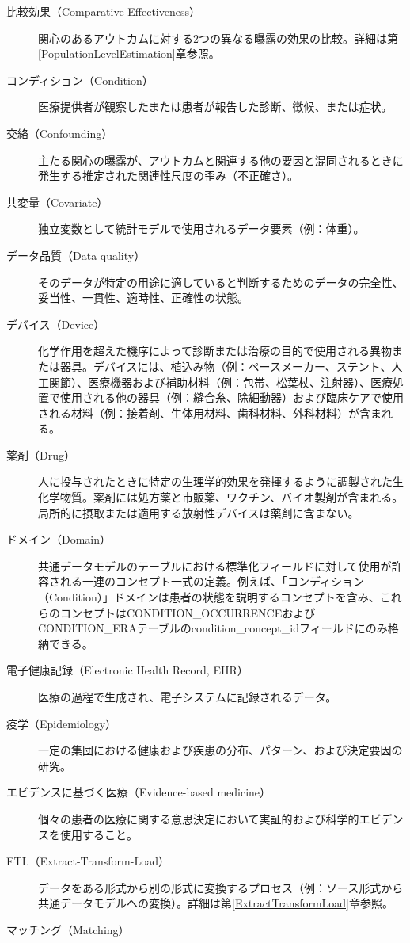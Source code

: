 \documentclass[
  11pt]{book}
\theoremstyle{definition}
\theoremstyle{definition}
\theoremstyle{definition}
\theoremstyle{definition}
\theoremstyle{remark}
\begin{document}
\begin{description}
\item[比較効果（Comparative Effectiveness）]
関心のあるアウトカムに対する2つの異なる曝露の効果の比較。詳細は第\ref{PopulationLevelEstimation}章参照。
\item[コンディション（Condition）]
医療提供者が観察したまたは患者が報告した診断、徴候、または症状。
\item[交絡（Confounding）]
主たる関心の曝露が、アウトカムと関連する他の要因と混同されるときに発生する推定された関連性尺度の歪み（不正確さ）。
\item[共変量（Covariate）]
独立変数として統計モデルで使用されるデータ要素（例：体重）。
\item[データ品質（Data quality）]
そのデータが特定の用途に適していると判断するためのデータの完全性、妥当性、一貫性、適時性、正確性の状態。
\item[デバイス（Device）]
化学作用を超えた機序によって診断または治療の目的で使用される異物または器具。デバイスには、植込み物（例：ペースメーカー、ステント、人工関節）、医療機器および補助材料（例：包帯、松葉杖、注射器）、医療処置で使用される他の器具（例：縫合糸、除細動器）および臨床ケアで使用される材料（例：接着剤、生体用材料、歯科材料、外科材料）が含まれる。
\item[薬剤（Drug）]
人に投与されたときに特定の生理学的効果を発揮するように調製された生化学物質。薬剤には処方薬と市販薬、ワクチン、バイオ製剤が含まれる。局所的に摂取または適用する放射性デバイスは薬剤に含まない。
\item[ドメイン（Domain）]
共通データモデルのテーブルにおける標準化フィールドに対して使用が許容される一連のコンセプト一式の定義。例えば、「コンディション（Condition）」ドメインは患者の状態を説明するコンセプトを含み、これらのコンセプトはCONDITION\_OCCURRENCEおよびCONDITION\_ERAテーブルのcondition\_concept\_idフィールドにのみ格納できる。
\item[電子健康記録（Electronic Health Record, EHR）]
医療の過程で生成され、電子システムに記録されるデータ。
\item[疫学（Epidemiology）]
一定の集団における健康および疾患の分布、パターン、および決定要因の研究。
\item[エビデンスに基づく医療（Evidence-based medicine）]
個々の患者の医療に関する意思決定において実証的および科学的エビデンスを使用すること。
\item[ETL（Extract-Transform-Load）]
データをある形式から別の形式に変換するプロセス（例：ソース形式から共通データモデルへの変換）。詳細は第\ref{ExtractTransformLoad}章参照。
\item[マッチング（Matching）]

\end{description}
\end{document}
